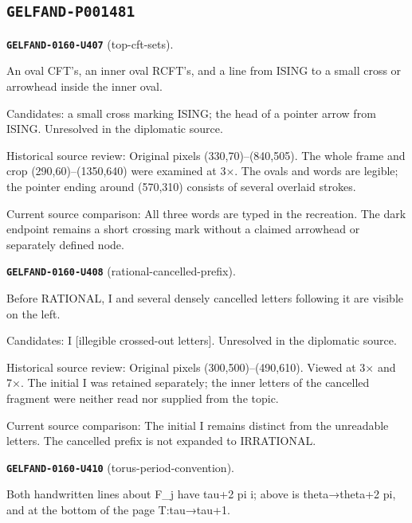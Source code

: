 \subsection*{\texttt{GELFAND-P001481}}
\par\noindent\leavevmode{}\label{GELFAND-0160-U407}\label{GELFAND-P001481:top-cft-sets}\textbf{\texttt{GELFAND-0160-U407}} (top-cft-sets).\nopagebreak[4]\par
An oval CFT’s, an inner oval RCFT’s, and a line from ISING to a small cross or arrowhead inside the inner oval.\par
Candidates: a small cross marking ISING; the head of a pointer arrow from ISING. Unresolved in the diplomatic source.\par
Historical source review: Original pixels (330,70)–(840,505). The whole frame and crop (290,60)–(1350,640) were examined at 3×. The ovals and words are legible; the pointer ending around (570,310) consists of several overlaid strokes.\par
Current source comparison: All three words are typed in the recreation. The dark endpoint remains a short crossing mark without a claimed arrowhead or separately defined node.\par\medskip
\par\noindent\leavevmode{}\label{GELFAND-0160-U408}\label{GELFAND-P001481:rational-cancelled-prefix}\textbf{\texttt{GELFAND-0160-U408}} (rational-cancelled-prefix).\nopagebreak[4]\par
Before RATIONAL, I and several densely cancelled letters following it are visible on the left.\par
Candidates: I [illegible crossed-out letters]. Unresolved in the diplomatic source.\par
Historical source review: Original pixels (300,500)–(490,610). Viewed at 3× and 7×. The initial I was retained separately; the inner letters of the cancelled fragment were neither read nor supplied from the topic.\par
Current source comparison: The initial I remains distinct from the unreadable letters. The cancelled prefix is not expanded to IRRATIONAL.\par\medskip
\par\noindent\leavevmode{}\label{GELFAND-0160-U410}\label{GELFAND-P001481:torus-period-convention}\textbf{\texttt{GELFAND-0160-U410}} (torus-period-convention).\nopagebreak[4]\par
Both handwritten lines about F\_j have tau+2 pi i; above is theta→theta+2 pi, and at the bottom of the page T:tau→tau+1.\par
